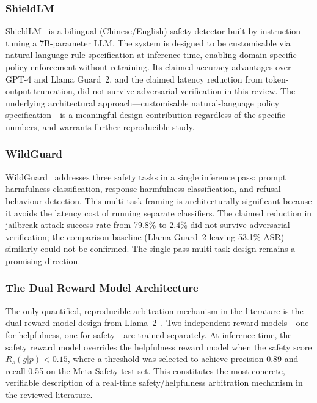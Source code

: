 \subsubsection{ShieldLM}

ShieldLM~\cite{zhang2024shieldlm} is a bilingual (Chinese/English) safety
detector built by instruction-tuning a 7B-parameter LLM.
The system is designed to be customisable via natural language rule specification at
inference time, enabling domain-specific policy enforcement without retraining.
Its claimed accuracy advantages over GPT-4 and Llama Guard~2, and the claimed
latency reduction from token-output truncation, did not survive adversarial
verification in this review.
The underlying architectural approach---customisable natural-language policy
specification---is a meaningful design contribution regardless of the specific
numbers, and warrants further reproducible study.

\subsubsection{WildGuard}

WildGuard~\cite{han2024wildguard} addresses three safety tasks in a single
inference pass: prompt harmfulness classification, response harmfulness classification,
and refusal behaviour detection.
This multi-task framing is architecturally significant because it avoids the latency
cost of running separate classifiers.
The claimed reduction in jailbreak attack success rate from 79.8\% to 2.4\% did not
survive adversarial verification; the comparison baseline (Llama Guard~2 leaving
53.1\% ASR) similarly could not be confirmed.
The single-pass multi-task design remains a promising direction.

\subsubsection{The Dual Reward Model Architecture}

The only quantified, reproducible arbitration mechanism in the literature is the
dual reward model design from Llama~2~\cite{touvron2023llama2}.
Two independent reward models---one for helpfulness, one for safety---are trained
separately.
At inference time, the safety reward model overrides the helpfulness reward model
when the safety score $R_s(g|p) < 0.15$, where a threshold was selected to achieve
precision 0.89 and recall 0.55 on the Meta Safety test set.
This constitutes the most concrete, verifiable description of a real-time
safety/helpfulness arbitration mechanism in the reviewed literature.

